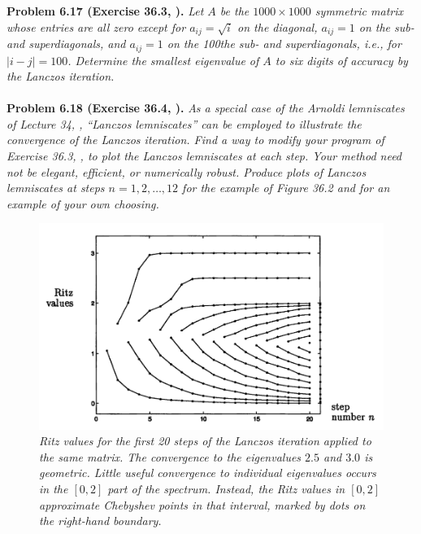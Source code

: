 \documentclass[a4paper,oneside]{book}
\numberwithin{equation}{chapter}
\begin{document}
\textbf{Problem 6.17 (Exercise 36.3, \cite{1}).} \textit{Let $A$ be the $1000 \times 1000$ symmetric matrix whose entries are all zero except for $a_{ij}=\sqrt i$ on the diagonal, $a_{ij}=1$ on the sub- and superdiagonals, and $a_{ij}=1$ on the 100the sub- and superdiagonals, i.e., for $\left|i-j\right|=100$. Determine the smallest eigenvalue of $A$ to six digits of accuracy by the Lanczos iteration.}\\
\\
\textbf{Problem 6.18 (Exercise 36.4, \cite{1}).} \textit{As a special case of the Arnoldi lemniscates of Lecture 34, \cite{1}, ``Lanczos lemniscates'' can be employed to illustrate the convergence of the Lanczos iteration. Find a way to modify your program of Exercise 36.3, \cite{1}, to plot the Lanczos lemniscates at each step. Your method need not be elegant, efficient, or numerically robust. Produce plots of Lanczos lemniscates at steps $n=1,2,\ldots,12$ for the example of Figure 36.2 and for an example of your own choosing.}
\begin{figure}[H]
	\centering
	\includegraphics[scale=0.35]{13}
	\caption{\textit{Ritz values for the first 20  steps of the Lanczos iteration applied to the same matrix. The convergence to the eigenvalues $2.5$ and $3.0$ is geometric. Little useful convergence to individual eigenvalues occurs in the $\left[0,2\right]$ part of the spectrum. Instead, the Ritz values in $\left[0,2\right]$ approximate Chebyshev points in that interval, marked by dots on the right-hand boundary.}}
\end{figure}
\end{document}
